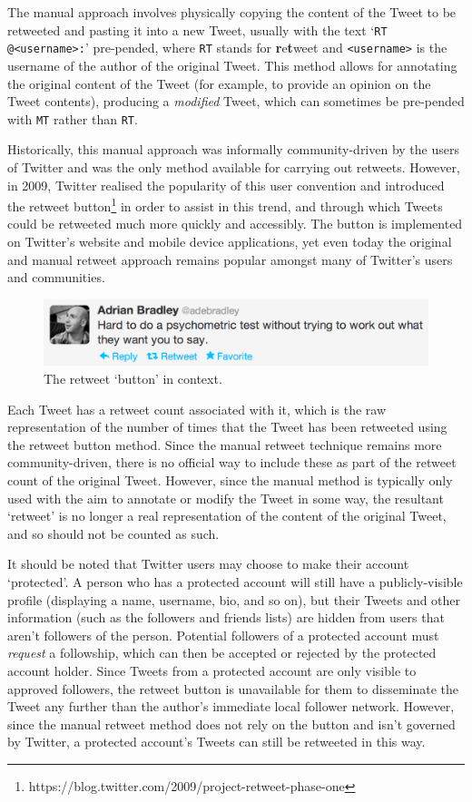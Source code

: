 The manual approach involves physically copying the content of the Tweet to be retweeted and pasting it into a new Tweet, usually with the text `\texttt{RT @<username>:}' pre-pended, where \texttt{RT} stands for \textbf{r}e\textbf{t}weet and \texttt{<username>} is the username of the author of the original Tweet. This method allows for annotating the original content of the Tweet (for example, to provide an opinion on the Tweet contents), producing a \textit{modified} Tweet, which can sometimes be pre-pended with \texttt{MT} rather than \texttt{RT}.

Historically, this manual approach was informally community-driven by the users of Twitter and was the only method available for carrying out retweets. However, in 2009, Twitter realised the popularity of this user convention and introduced the retweet button\footnote{https://blog.twitter.com/2009/project-retweet-phase-one} in order to assist in this trend, and through which Tweets could be retweeted much more quickly and accessibly. The button is implemented on Twitter's website and mobile device applications, yet even today the original and manual retweet approach remains popular amongst many of Twitter's users and communities.

\begin{figure}[h]
\centering
\includegraphics[scale=0.3]{2.Background/Media/retweet_button.png} 
\caption{The retweet `button' in context.}
\label{fig:retweet_button}
\end{figure}

Each Tweet has a retweet count associated with it, which is the raw representation of the number of times that the Tweet has been retweeted using the retweet button method. Since the manual retweet technique remains more community-driven, there is no official way to include these as part of the retweet count of the original Tweet. However, since the manual method is typically only used with the aim to annotate or modify the Tweet in some way, the resultant `retweet'  is no longer a real representation of the content of the original Tweet, and so should not be counted as such.

It should be noted that Twitter users may choose to make their account `protected'. A person who has a protected account will still have a publicly-visible profile (displaying a name, username, bio, and so on), but their Tweets and other information (such as the followers and friends lists) are hidden from users that aren't followers of the person. Potential followers of a protected account must \textit{request} a followship, which can then be accepted or rejected by the protected account holder. Since Tweets from a protected account are only visible to approved followers, the retweet button is unavailable for them to disseminate the Tweet any further than the author's immediate local follower network. However, since the manual retweet method does not rely on the button and isn't governed by Twitter, a protected account's Tweets can still be retweeted in this way.

